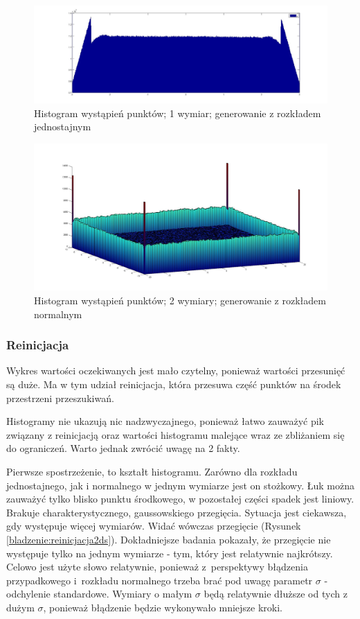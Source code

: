 \documentclass{mini}
\begin{document}
\begin{figure}[H]
\centering
\includegraphics[width=\textwidth]{p_j_100M_1__3_3}
\caption{Histogram wystąpień punktów; 1 wymiar; generowanie z rozkładem jednostajnym}
\label{bladzenie:rzutowanie1dj}
\end{figure}

\begin{figure}[H]
\centering
\includegraphics[width=\textwidth]{p_n_10M_2__20_20__10_10_4_2}
\caption{Histogram wystąpień punktów; 2 wymiary; generowanie z rozkładem normalnym}
\label{bladzenie:rzutowanie2d}
\end{figure}

\subsubsection*{Reinicjacja}
Wykres wartości oczekiwanych jest mało czytelny, ponieważ wartości przesunięć są duże. Ma w tym udział reinicjacja, która przesuwa część punktów na środek przestrzeni przeszukiwań.

Histogramy nie ukazują nic nadzwyczajnego, ponieważ łatwo zauważyć pik związany z reinicjacją oraz wartości histogramu malejące wraz ze zbliżaniem się do ograniczeń. Warto jednak zwrócić uwagę na 2 fakty.

Pierwsze spostrzeżenie, to kształt histogramu. Zarówno dla rozkładu jednostajnego, jak i normalnego w jednym wymiarze jest on stożkowy. Łuk można zauważyć tylko blisko punktu środkowego, w pozostałej części spadek jest liniowy. Brakuje charakterystycznego, gaussowskiego przegięcia. Sytuacja jest ciekawsza, gdy występuje więcej wymiarów. Widać wówczas przegięcie (Rysunek \ref{bladzenie:reinicjacja2ds}). Dokładniejsze badania pokazały, że przegięcie nie występuje tylko na jednym wymiarze - tym, który jest relatywnie najkrótszy. Celowo jest użyte słowo relatywnie, ponieważ z~perspektywy błądzenia przypadkowego i~rozkładu normalnego trzeba brać pod uwagę parametr $\sigma$ - odchylenie standardowe. Wymiary o małym $\sigma$ będą relatywnie dłuższe od tych z dużym $\sigma$, ponieważ błądzenie będzie wykonywało mniejsze kroki.
\end{document}
